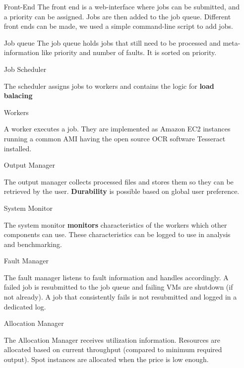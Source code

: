 \documentclass[10pt]{article}
\begin{document}
\begin{itemize}

\item[Front-End] The front end \textbf{}is a web-interface where jobs can be submitted, and a priority can be assigned. Jobs are then added to the job queue. Different front ends can be made, we used a simple command-line script to add jobs.

\item[Job queue] The job queue holds jobs that still need to be processed and meta-information like priority and number of faults. It is sorted on priority.

\item[Job Scheduler]

The scheduler assigns jobs to workers and contains the logic for \textbf{load balacing}

\item[Workers]

A worker executes a job. They are implemented as Amazon EC2 instances running a common AMI having the open source OCR software Tesseract installed.

\item[Output Manager]

The output manager collects processed files and stores them so they can be retrieved by the user. \textbf{Durability} is possible based on global user preference.

\item[System Monitor]

The system monitor \textbf{monitors} characteristics of the workers which other components can use. These characteristics can be logged to use in analysis and benchmarking.

\item[Fault Manager]

The fault manager listens to fault information and handles accordingly. A failed job is resubmitted to the job queue and failing VMs are shutdown (if not already). A job that consistently fails is not resubmitted and logged in a dedicated log.

\item[Allocation Manager]

The Allocation Manager receives utilization information. Resources are allocated based on current throughput (compared to minimum required output). Spot instances are allocated when the price is low enough.

\end{itemize}
\end{document}
